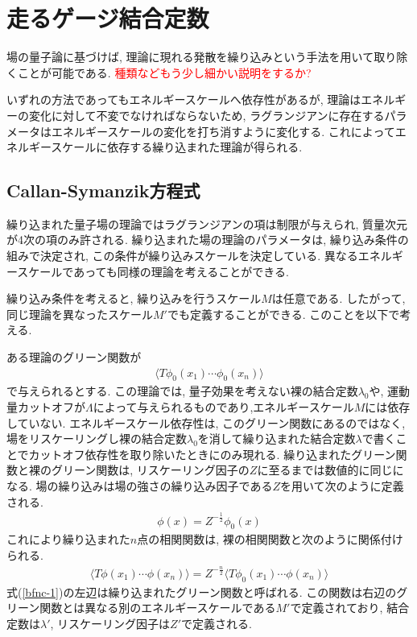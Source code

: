 \section{走るゲージ結合定数}
場の量子論に基づけば, 理論に現れる発散を繰り込みという手法を用いて取り除くことが可能である.
\textcolor{red}{種類などもう少し細かい説明をするか?}

いずれの方法であってもエネルギースケールへ依存性があるが, 理論はエネルギーの変化に対して不変でなければならないため, ラグランジアンに存在するパラメータはエネルギースケールの変化を打ち消すように変化する.
これによってエネルギースケールに依存する繰り込まれた理論が得られる.
\subsection{Callan-Symanzik方程式}
繰り込まれた量子場の理論ではラグランジアンの項は制限が与えられ, 質量次元が4次の項のみ許される.
繰り込まれた場の理論のパラメータは, 繰り込み条件の組みで決定され, この条件が繰り込みスケールを決定している.
異なるエネルギースケールであっても同様の理論を考えることができる.

繰り込み条件を考えると, 繰り込みを行うスケール$M$は任意である.
したがって, 同じ理論を異なったスケール$M'$でも定義することができる.
このことを以下で考える. 

ある理論のグリーン関数が
\begin{align}
  \langle T \phi_0(x_1)\cdots\phi_0(x_n)\rangle  \label{rescale1}
\end{align}
で与えられるとする.
この理論では, 量子効果を考えない裸の結合定数$\lambda_0$や, 運動量カットオフが$\Lambda$によって与えられるものであり,エネルギースケール$M$には依存していない.
エネルギースケール依存性は, このグリーン関数にあるのではなく, 場をリスケーリングし裸の結合定数$\lambda_0$を消して繰り込まれた結合定数$\lambda$で書くことでカットオフ依存性を取り除いたときにのみ現れる.
繰り込まれたグリーン関数と裸のグリーン関数は, リスケーリング因子の$Z$に至るまでは数値的に同じになる.
場の繰り込みは場の強さの繰り込み因子である$Z$を用いて次のように定義される.
\begin{align}
  \phi(x) = Z^{-\frac{1}{2}}\phi_0(x) \label{bfnc-2}
\end{align}
これにより繰り込まれた$n$点の相関関数は, 裸の相関関数と次のように関係付けられる.
\begin{align}
  \langle T \phi(x_1)\cdots \phi(x_n)\rangle = Z^{-\frac{n}{2}}\langle T \phi_0(x_1)\cdots \phi(x_n)\rangle \label{bfnc-1}
\end{align}
式(\ref{bfnc-1})の左辺は繰り込まれたグリーン関数と呼ばれる.
この関数は右辺のグリーン関数とは異なる別のエネルギースケールである$M'$で定義されており, 結合定数は$\lambda'$, リスケーリング因子は$Z'$で定義される.

